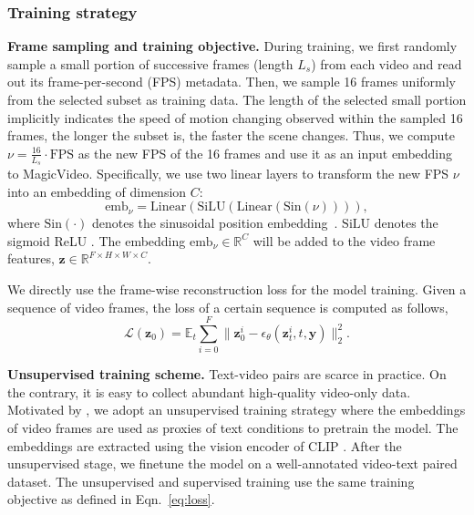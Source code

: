\documentclass[10pt,twocolumn,letterpaper]{article}
\newcommand{\E}{\mathbb{E}}
\def\vy{{\bm{y}}}
\def\vz{{\bm{z}}}
\newcommand{\myPara}[1]{\vspace{6pt}\noindent\textbf{#1}}
\begin{document}
\subsubsection{Training strategy}
\label{subsubsec:sampling}
\myPara{Frame sampling and training objective.}
During training, we first randomly sample a small portion of successive frames (length $L_s$)  from each video and read out its frame-per-second (FPS) metadata. Then, we sample 16 frames uniformly from the selected subset as training data. The length of the selected small portion implicitly indicates the speed of motion changing observed within the sampled 16 frames, \ie the longer the subset is, the faster the scene changes. Thus, we compute $\nu =  \frac{16}{L_s}\cdot \text{FPS}$ as the new FPS of the 16 frames and use it as an input embedding to MagicVideo. Specifically, we  use two linear layers to transform the new FPS $\nu$  into an embedding of dimension $C$:
\begin{equation}
   \text{emb}_{\nu} = \text{Linear}(\text{SiLU}(\text{Linear}(\text{Sin}(\nu)))),
\end{equation}
where $\text{Sin}(\cdot)$ denotes the sinusoidal position embedding~\cite{vaswani2017attention}. $\text{SiLU}$ denotes the sigmoid ReLU \cite{elfwing2018sigmoid}. The embedding $\text{emb}_{\nu} \in \mathbb{R}^{ C}$ will be added to the video frame features, $\vz \in \mathbb{R}^{F\times H \times W \times C}$. 


We directly use the frame-wise reconstruction loss for the model training. Given a sequence of video frames, the loss of a certain sequence is computed as follows, 
\begin{equation}
        \mathcal{L}(\vz_0) = \E_{t}\sum_{i=0}^F {\|\vz_0^i - \epsilon_{\theta}(\vz^i_t, t, \vy)\|_2^2}.
        \label{eq:loss}
\end{equation}

\myPara{Unsupervised training scheme.}
\label{subsec:unsupervised_training}
Text-video pairs are scarce in practice. On the contrary, it is easy to collect abundant high-quality   video-only   data. Motivated by \cite{singer_make--video_2022}, we adopt an unsupervised training strategy where the embeddings of video frames are used as proxies of text conditions to pretrain the model. The embeddings are extracted using the vision encoder of CLIP \cite{clip}. After the unsupervised stage, we finetune the model on a  well-annotated video-text paired dataset. The unsupervised and supervised training use the same training objective as defined in Eqn.~\eqref{eq:loss}.
\end{document}
